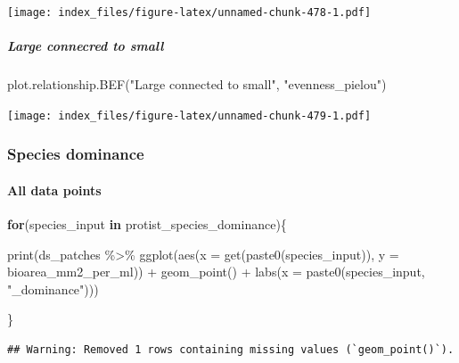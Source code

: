 \documentclass[
]{article}
\newenvironment{Shaded}{\begin{snugshade}}{\end{snugshade}}
\newcommand{\AttributeTok}[1]{\textcolor[rgb]{0.77,0.63,0.00}{#1}}
\newcommand{\ControlFlowTok}[1]{\textcolor[rgb]{0.13,0.29,0.53}{\textbf{#1}}}
\newcommand{\FunctionTok}[1]{\textcolor[rgb]{0.00,0.00,0.00}{#1}}
\newcommand{\NormalTok}[1]{#1}
\newcommand{\SpecialCharTok}[1]{\textcolor[rgb]{0.00,0.00,0.00}{#1}}
\newcommand{\StringTok}[1]{\textcolor[rgb]{0.31,0.60,0.02}{#1}}
\begin{document}
\texttt{[image: index\_files/figure-latex/unnamed-chunk-478-1.pdf]}

\hypertarget{large-connecred-to-small-2}{%
\subparagraph{Large connecred to
small}\label{large-connecred-to-small-2}}

\begin{Shaded}
\begin{Highlighting}[]
\FunctionTok{plot.relationship.BEF}\NormalTok{(}\StringTok{"Large connected to small"}\NormalTok{,}
                      \StringTok{"evenness\_pielou"}\NormalTok{)}
\end{Highlighting}
\end{Shaded}

\texttt{[image: index\_files/figure-latex/unnamed-chunk-479-1.pdf]}

\hypertarget{species-dominance-4}{%
\subsubsection{Species dominance}\label{species-dominance-4}}

\hypertarget{all-data-points-4}{%
\paragraph{All data points}\label{all-data-points-4}}

\begin{Shaded}
\begin{Highlighting}[]
\ControlFlowTok{for}\NormalTok{(species\_input }\ControlFlowTok{in}\NormalTok{ protist\_species\_dominance)\{}
  
  \FunctionTok{print}\NormalTok{(ds\_patches }\SpecialCharTok{\%\textgreater{}\%}
  \FunctionTok{ggplot}\NormalTok{(}\FunctionTok{aes}\NormalTok{(}\AttributeTok{x =} \FunctionTok{get}\NormalTok{(}\FunctionTok{paste0}\NormalTok{(species\_input)),}
             \AttributeTok{y =}\NormalTok{ bioarea\_mm2\_per\_ml)) }\SpecialCharTok{+}
  \FunctionTok{geom\_point}\NormalTok{() }\SpecialCharTok{+}
    \FunctionTok{labs}\NormalTok{(}\AttributeTok{x =} \FunctionTok{paste0}\NormalTok{(species\_input, }\StringTok{"\_dominance"}\NormalTok{)))}
  
\NormalTok{\}}
\end{Highlighting}
\end{Shaded}

\begin{verbatim}
## Warning: Removed 1 rows containing missing values (`geom_point()`).
\end{verbatim}
\end{document}
